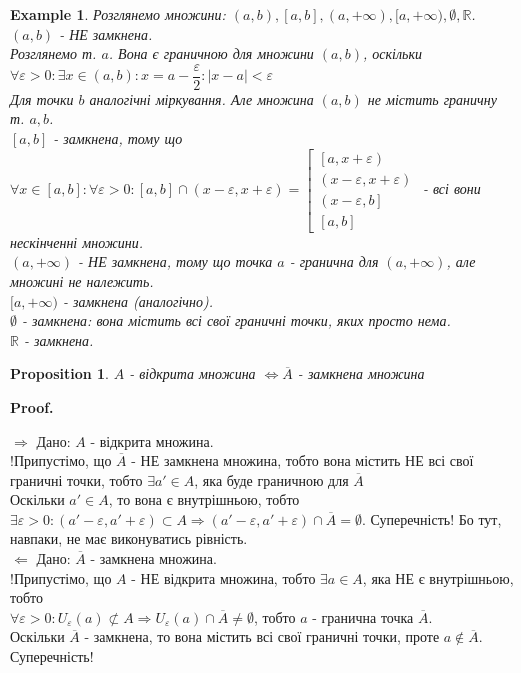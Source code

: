 \documentclass[a4paper, 14pt]{article}
\makeatletter
\def\qed{$\blacksquare$}
\def\rightproof{$\boxed{\Rightarrow}$ }
\def\leftproof{$\boxed{\Leftarrow}$ }
\theoremstyle{theoremdd}
\theoremstyle{theoremdd}
\theoremstyle{theoremdd}
\theoremstyle{theoremdd}
\newtheorem{example}[theorem]{Example}
\theoremstyle{theoremdd}
\newtheorem{proposition}[theorem]{Proposition}
\theoremstyle{theoremdd}
\theoremstyle{theoremdd}
\theoremstyle{theoremdd}
\renewenvironment{proof}[1][Proof.\\]{\par
\pushQED{\hfill \qed}%
\normalfont \topsep6\p@\@plus6\p@\relax
\trivlist
\item\relax
{\bfseries
#1\@addpunct{.}}\hspace\labelsep\ignorespaces
}{%
\popQED\endtrivlist\@endpefalse
}
\makeatother
\begin{document}
\begin{example}
Розглянемо множини: $(a,b), [a,b], (a,+\infty), [a,+\infty), \emptyset, \mathbb{R}$.\\
$(a,b)$ - НЕ замкнена.\\
Розглянемо т. $a$. Вона є граничною для множини $(a,b)$, оскільки\\
$\forall \varepsilon > 0: \exists x \in (a,b): x = a - \dfrac{\varepsilon}{2}: |x-a| < \varepsilon$\\
Для точки $b$ аналогічні міркування. Але множина $(a,b)$ не містить граничну т. $a,b$.
\bigskip \\

$[a,b]$ - замкнена, тому що $\forall x \in [a,b]: \forall \varepsilon > 0: [a,b] \cap (x-\varepsilon,x+\varepsilon) = \left[
\begin{gathered}
\left[a,x+\varepsilon \right) \\
\left(x-\varepsilon, x + \varepsilon \right) \\
\left(x - \varepsilon, b\right] \\
\left[a,b\right]
\end{gathered}
 \right.$ - всі вони нескінченні множини.
\bigskip \\
$(a,+\infty)$ - НЕ замкнена, тому що точка $a$ - гранична для $(a,+\infty)$, але множині не належить.
\bigskip \\
$[a,+\infty)$ - замкнена (аналогічно).
\bigskip \\
$\emptyset$ - замкнена: вона містить всі свої граничні точки, яких просто нема.
\bigskip \\
$\mathbb{R}$ - замкнена.
\end{example}

\begin{proposition}
$A$ - відкрита множина $\iff \overline{A}$ - замкнена множина
\end{proposition}

\begin{proof}
\rightproof Дано: $A$ - відкрита множина.\\
!Припустімо, що $\overline{A}$ - НЕ замкнена множина, тобто вона містить НЕ всі свої граничні точки, тобто $\exists a' \in A$, яка буде граничною для $\overline{A}$\\
Оскільки $a' \in A$, то вона є внутрішньою, тобто $\exists \varepsilon > 0: (a'-\varepsilon,a'+\varepsilon) \subset A \Rightarrow (a'-\varepsilon,a'+\varepsilon) \cap \overline{A} = \emptyset$. Суперечність! Бо тут, навпаки, не має виконуватись рівність.
\bigskip \\
\leftproof Дано: $\overline{A}$ - замкнена множина.\\
!Припустімо, що $A$ - НЕ відкрита множина, тобто $\exists a \in A$, яка НЕ є внутрішньою, тобто\\
$\forall \varepsilon > 0: U_{\varepsilon}(a) \not\subset A \Rightarrow U_{\varepsilon}(a) \cap \overline{A} \neq \emptyset$, тобто $a$ - гранична точка $\overline{A}$.\\
Оскільки $\overline{A}$ - замкнена, то вона містить всі свої граничні точки, проте $a \not\in \overline{A}$. Суперечність!
\end{proof}
\end{document}
